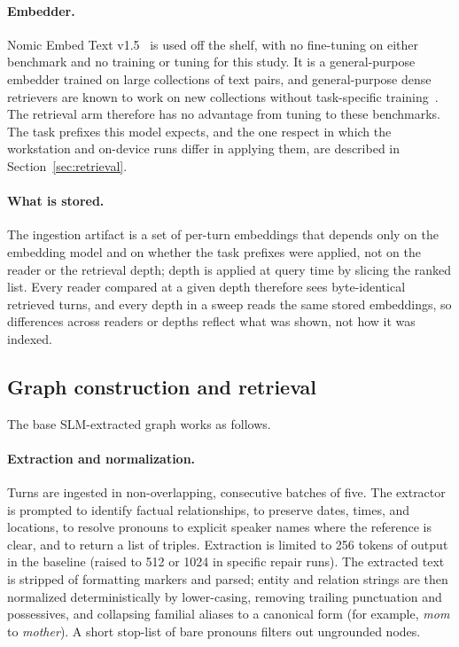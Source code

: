 \paragraph{Embedder.} Nomic Embed Text v1.5~\citep{nomic_embed} is used off the shelf, with no
fine-tuning on either benchmark and no training or tuning for this study. It is a
general-purpose embedder trained on large collections of text pairs, and general-purpose dense
retrievers are known to work on new collections without task-specific training~\citep{contriever}.
The retrieval arm therefore has no advantage from tuning to these benchmarks. The task prefixes this model expects, and the one respect in which the workstation
and on-device runs differ in applying them, are described in Section~\ref{sec:retrieval}.

\paragraph{What is stored.} The ingestion artifact is a set of per-turn embeddings that depends only
on the embedding model and on whether the task prefixes were applied, not on the reader or the
retrieval depth; depth is applied at query time by slicing the ranked list. Every reader compared at
a given depth therefore sees byte-identical retrieved turns, and every depth in a sweep reads the same
stored embeddings, so differences across readers or depths reflect what was shown, not how it was
indexed.

\subsection{Graph construction and retrieval}
\label{sec:graph_details}

The base SLM-extracted graph works as follows.

\paragraph{Extraction and normalization.} Turns are ingested in non-overlapping, consecutive batches
of five. The extractor is prompted to identify factual relationships, to preserve dates, times, and
locations, to resolve pronouns to explicit speaker names where the reference is clear, and to return a
list of triples. Extraction is limited to 256 tokens of output in the baseline (raised to 512 or 1024 in
specific repair runs). The extracted text is stripped of formatting markers and parsed; entity and
relation strings are then normalized deterministically by lower-casing, removing trailing
punctuation and possessives, and collapsing familial aliases to a canonical form (for example,
\emph{mom} to \emph{mother}). A short stop-list of bare pronouns filters out ungrounded nodes.

